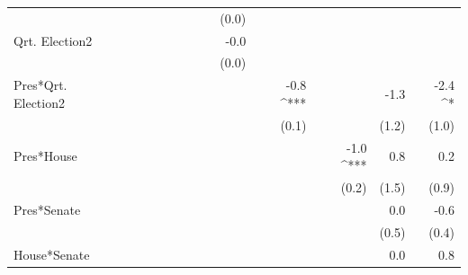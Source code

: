 \documentclass[a4paper]{article}\usepackage{graphicx, color}
\begin{document}
\begin{table}[ht]
\begin{center}
{\begin{tabular}{ l D{.}{.}{1}D{.}{.}{1}D{.}{.}{1}D{.}{.}{1}D{.}{.}{1}D{.}{.}{1}D{.}{.}{1}D{.}{.}{1}D{.}{.}{1}D{.}{.}{1}D{.}{.}{1}D{.}{.}{1} }
                     &                 &                 &                 &                 &                 &                 &                 & (0.0)           &                 &                 &                 &                \\ 
Qrt. Election2       &                 &                 &                 &                 &                 &                 &                 & -0.0            &                 &                 &                 &                \\ 
                     &                 &                 &                 &                 &                 &                 &                 & (0.0)           &                 &                 &                 &                \\ 
Pres*Qrt. Election2  &                 &                 &                 &                 &                 &                 &                 &                 & -0.8 ^{***}     &                 & -1.3            & -2.4 ^*        \\ 
                     &                 &                 &                 &                 &                 &                 &                 &                 & (0.1)           &                 & (1.2)           & (1.0)          \\ 
Pres*House           &                 &                 &                 &                 &                 &                 &                 &                 &                 & -1.0 ^{***}     & 0.8             & 0.2            \\ 
                     &                 &                 &                 &                 &                 &                 &                 &                 &                 & (0.2)           & (1.5)           & (0.9)          \\ 
Pres*Senate          &                 &                 &                 &                 &                 &                 &                 &                 &                 &                 & 0.0             & -0.6           \\ 
                     &                 &                 &                 &                 &                 &                 &                 &                 &                 &                 & (0.5)           & (0.4)          \\ 
House*Senate         &                 &                 &                 &                 &                 &                 &                 &                 &                 &                 & 0.0             & 0.8            \\ 

\end{tabular}}
\end{center}
\end{table}
\end{document}
